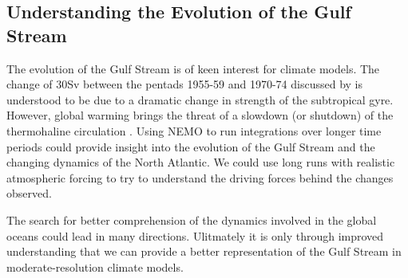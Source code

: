 \documentclass[..\report.tex]{subfiles}
\begin{document}
\subsection{Understanding the Evolution of the Gulf Stream}
\label{SSEC:UnderstandingEvolution}
The evolution of the Gulf Stream is of keen interest for climate models.
The change of 30Sv between the pentads 1955-59 and 1970-74 discussed by \citet{Greatbatch1991} is understood to be due to a dramatic change in strength of the subtropical gyre. 
However, global warming brings the threat of a slowdown (or shutdown) of the thermohaline circulation \citep{Gough1998}.
Using \gls{NEMO} to run integrations over longer time periods could provide insight into the evolution of the Gulf Stream and the changing dynamics of the North Atlantic. 
We could use long runs with realistic atmospheric forcing to try to understand the driving forces behind the changes observed. \\

\par

The search for better comprehension of the dynamics involved in the global oceans could lead in many directions.
Ulitmately it is only through improved understanding that we can provide a better representation of the Gulf Stream in moderate-resolution climate models. 
\end{document}
